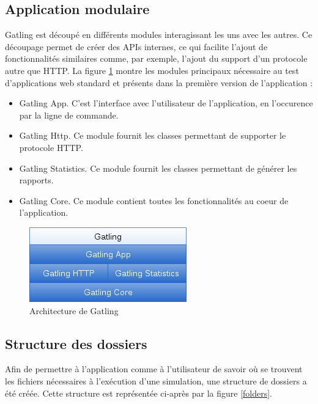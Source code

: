 \subsection{Application modulaire}
Gatling est découpé en différents modules interagissant les uns avec les autres. Ce découpage permet de créer des APIs internes, ce qui facilite l'ajout de fonctionnalités similaires comme, par exemple, l'ajout du support d'un protocole autre que HTTP. La figure \ref{arch} montre les modules principaux nécessaire au test d'applications web standard et présents dans la première version de l'application :
\begin{itemize}
  \item Gatling App. C'est l'interface avec l'utilisateur de l'application, en l'occurence par la ligne de commande.
  \item Gatling Http. Ce module fournit les classes permettant de supporter le protocole HTTP.
  \item Gatling Statistics. Ce module fournit les classes permettant de générer les rapports.
  \item Gatling Core. Ce module contient toutes les fonctionnalités au coeur de l'application.
\end{itemize}

\begin{figure}[h]
\begin{center}
\includegraphics{img/arch.png}
\end{center}
\caption{Architecture de Gatling}
\label{arch}
\end{figure}

\subsection{Structure des dossiers}
Afin de permettre à l'application comme à l'utilisateur de savoir où se trouvent les fichiers nécessaires à l'exécution d'une simulation, une structure de dossiers a été créée. Cette structure est représentée ci-après par la figure \ref{folders}.

